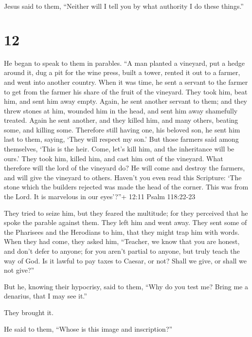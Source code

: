 Jesus said to them, ``Neither will I tell you by what authority I do
these things.''

\hypertarget{section-11}{%
\section{12}\label{section-11}}

 He began to speak to them in parables. ``A man planted a
vineyard, put a hedge around it, dug a pit for the wine press, built a
tower, rented it out to a farmer, and went into another country.
 When it was time, he sent a servant to the farmer to get
from the farmer his share of the fruit of the vineyard. 
They took him, beat him, and sent him away empty.  Again, he
sent another servant to them; and they threw stones at him, wounded him
in the head, and sent him away shamefully treated.  Again he
sent another, and they killed him, and many others, beating some, and
killing some.  Therefore still having one, his beloved son,
he sent him last to them, saying, `They will respect my son.'
 But those farmers said among themselves, `This is the heir.
Come, let's kill him, and the inheritance will be ours.' 
They took him, killed him, and cast him out of the vineyard.
 What therefore will the lord of the vineyard do? He will
come and destroy the farmers, and will give the vineyard to others.
 Haven't you even read this Scripture: `The stone which the
builders rejected was made the head of the corner.  This
was from the Lord. It is marvelous in our eyes'?''+ 12:11 Psalm
118:22-23

 They tried to seize him, but they feared the multitude;
for they perceived that he spoke the parable against them. They left him
and went away.  They sent some of the Pharisees and the
Herodians to him, that they might trap him with words. 
When they had come, they asked him, ``Teacher, we know that you are
honest, and don't defer to anyone; for you aren't partial to anyone, but
truly teach the way of God. Is it lawful to pay taxes to Caesar, or not?
 Shall we give, or shall we not give?''

But he, knowing their hypocrisy, said to them, ``Why do you test me?
Bring me a denarius, that I may see it.''

 They brought it.

He said to them, ``Whose is this image and inscription?''

